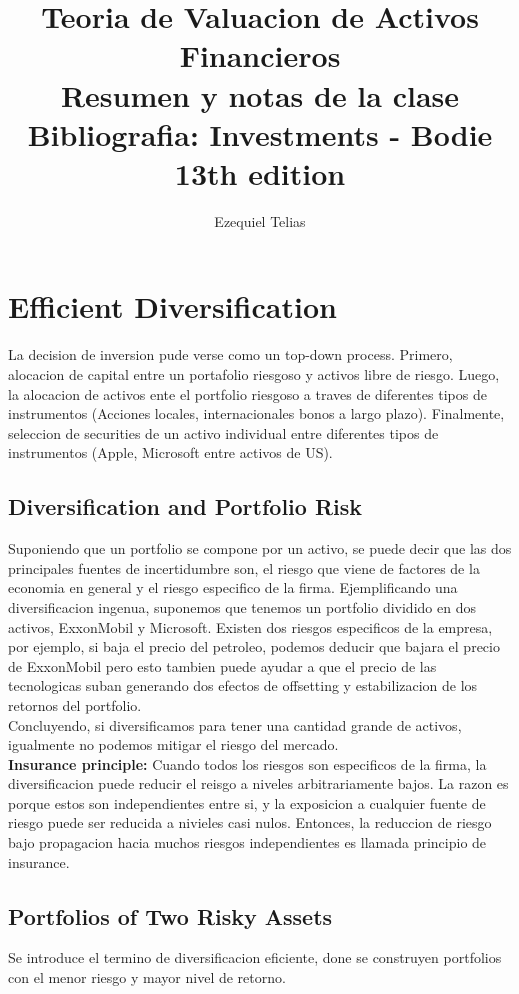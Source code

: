 \documentclass{article}
\title{
    \textbf{Teoria de Valuacion de Activos Financieros} \\ 
    Resumen y notas de la clase
    \\
    \small Bibliografia: Investments - Bodie 13th edition
}
\author{Ezequiel Telias}
\date{}
\begin{document}
\maketitle

\section{Efficient Diversification}
La decision de inversion pude verse como un top-down process. Primero, alocacion de capital entre un portafolio riesgoso y activos
libre de riesgo. Luego, la alocacion de activos ente el portfolio riesgoso a traves de diferentes tipos de instrumentos (Acciones locales, internacionales
bonos a largo plazo). Finalmente, seleccion de securities de un activo individual entre diferentes tipos de instrumentos (Apple, Microsoft entre activos de US).

\subsection{Diversification and Portfolio Risk}
Suponiendo que un portfolio se compone por un activo, se puede decir que las dos principales fuentes de incertidumbre son, 
el riesgo que viene de factores de la economia en general y el riesgo especifico de la firma.
Ejemplificando una diversificacion ingenua, suponemos que tenemos un portfolio dividido en dos activos, ExxonMobil y Microsoft. Existen dos riesgos especificos
de la empresa, por ejemplo, si baja el precio del petroleo, podemos deducir que bajara el precio de ExxonMobil pero esto tambien puede ayudar a que el precio de las 
tecnologicas suban generando dos efectos de offsetting y estabilizacion de los retornos del portfolio. 
\\

Concluyendo, si diversificamos para tener una cantidad grande de activos, igualmente no podemos mitigar el riesgo del mercado.
\\

\textbf{Insurance principle:} Cuando todos los riesgos son especificos de la firma, la diversificacion puede reducir el reisgo a niveles arbitrariamente bajos. 
La razon es porque estos son independientes entre si, y la exposicion a cualquier fuente de riesgo puede ser reducida a nivieles casi nulos. Entonces, la reduccion de riesgo 
bajo propagacion hacia muchos riesgos independientes es llamada principio de insurance.

\subsection{Portfolios of Two Risky Assets}
Se introduce el termino de diversificacion eficiente, done se construyen portfolios con el menor riesgo y mayor nivel de retorno. 
\\
\end{document}
